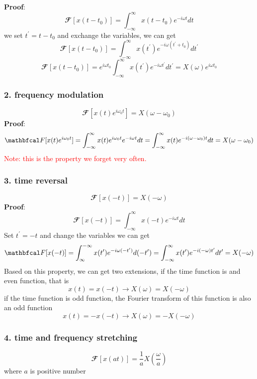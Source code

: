 \documentclass[revised,endfloat]{geophysics}
\begin{document}
{\bf Proof}:
$$
{\mathbfcal F}[x(t-t_0)]  = \int_{-\infty}^{\infty} x(t - t_0) e^{-i\omega t} dt  
$$
we set $t^{\prime} = t - t_0$ and exchange the variables, we can get
$$
{\mathbfcal F}[x(t-t_0)]  = \int_{-\infty}^{\infty} x(t^{\prime}) e^{-i\omega (t^{\prime} + t_0)} d t^{\prime}  $$
$$
{\mathbfcal F}[x(t-t_0)] = e^{i \omega t_0} \int_{-\infty}^{\infty} x(t^{\prime}) e^{-i\omega t^{\prime}} d t^{\prime} = X(\omega) e^{i \omega t_0}
$$

\subsubsection{2. frequency modulation}
\begin{equation}
{\mathbfcal F}[x(t)e^{i \omega_0 t}] = X(\omega-\omega_0)
\end{equation}
{\bf Proof}:
$$
{\mathbfcal F}[x(t)e^{i \omega_0 t}]  = \int_{-\infty}^{\infty} x(t)e^{i \omega_0 t} e^{-i\omega t} dt  \\
=  \int_{-\infty}^{\infty} x(t) e^{-i (\omega-\omega_0) t} dt  =  X(\omega-\omega_0)
$$
\textcolor{red}{Note: this is the property we forget very often.}

\subsubsection{3. time reversal}
\begin{equation}
{\mathbfcal F}[x(-t)] = X(-\omega)
\end{equation}
{\bf Proof}:
$$ {\mathbfcal F}[x(-t)]  = \int_{-\infty}^{\infty} x(-t)e^{-i \omega t} dt  $$
Set $t^{\prime} = -t$ and change the variables we can get
$$ {\mathbfcal F}[x(-t)]  = \int_{\infty}^{-\infty} x(t^{\prime}) e^{-i \omega (-t^{\prime})} d (-t^{\prime}) \\
= \int_{-\infty}^{\infty} x(t^{\prime}) e^{-i (-\omega) t^{\prime}} d t^{\prime} \\
= X(-\omega)$$
Based on this property, we can get two extensions, if the time function is and even function, that is
$$x(t) = x(-t) \rightarrow X(\omega) = X(-\omega)$$
if the time function is odd function, the Fourier transform of this function is also an odd function
$$x(t) = -x(-t) \rightarrow X(\omega) = - X(-\omega)$$

\subsubsection{4. time and frequency stretching}
\begin{equation}
{\mathbfcal F}[x(at)] = \frac{1}{a}X(\frac{\omega}{a})
\end{equation}
where $a$ is positive number
\end{document}
